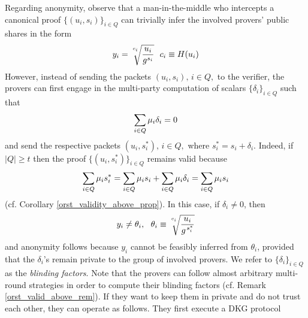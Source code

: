 \documentclass{iacrtrans}
\begin{document}
Regarding anonymity, observe  that a man-in-the-middle
who intercepts a canonical proof
$\{(u_i, s_i)\}_{i \in Q}$ can trivially
infer the involved provers' public shares in the form
\vspace{5pt}
\begin{equation}\label{orst_leaked_public}
y_i =
\sqrt[\leftroot{0}\uproot{10}c_i]{\frac{u_i}{g ^ {s_i}}}
\ \ c_i \equiv H(u_i)
\vspace{5pt}
\end{equation}
\noindent
However, instead of sending the packets
$(u_i, s_i),\hspace{2pt} i \in Q,$ to the verifier,
the provers can first engage in the multi-party computation
of scalars $\{\delta_i\}_{i \in Q}$ such that
\vspace{5pt}
\begin{equation}\label{orst_deviations}
\sum_{i \in Q} \mu_i \delta_i = 0
\vspace{5pt}
\end{equation}
and send the respective packets $(u_i, s_i^*),\hspace{2pt} i \in Q,$
where $s_i^* = s_i + \delta_i$.
Indeed, if $|Q| \ge t$
then the proof $\{(u_i, s_i^*)\}_{i \in Q}$ remains valid because
\vspace{5pt}
\begin{equation*}
\sum_{i \in Q} \mu_i s_i^* =
\sum_{i \in Q} \mu_i s_i + \sum_{i \in Q} \mu_i \delta_i = 
\sum_{i \in Q} \mu_i s_i
\vspace{5pt}
\end{equation*}
\noindent
(cf. Corollary \ref{orst_validity_above_prop}).
In this case, if $\delta_i \neq 0$, then
\vspace{5pt}
\begin{equation*}\label{orst_thetas}
y_i \neq \theta_i,
\ \ \theta_i \equiv
\sqrt[\leftroot{0}\uproot{10}c_i]{\frac{u_i}{g ^ {\hspace{1pt}s_i^*}}}
\vspace{5pt}
\end{equation*}
and anonymity follows because $y_i$
cannot be feasibly inferred from $\theta_i$,
provided that the $\delta_i$'s
remain private to the group of involved provers.
We refer to $\{\delta_i\}_{i \in Q}$
as the \textit{blinding factors}.
Note that the provers can follow almost arbitrary
multi-round strategies
in order to compute their blinding factors
(cf. Remark \ref{orst_valid_above_rem}).
If they want to keep them
in private and do not trust each other,
they can operate as follows.
They first execute a DKG protocol
\end{document}
